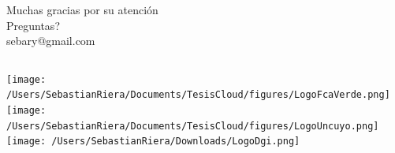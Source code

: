\documentclass{beamer}\usepackage[]{graphicx}\usepackage[]{color}
\begin{document}
\begin{frame}
  \centering
   Muchas gracias por su atención \\
       \vspace{0.5cm}        \centering
       Preguntas? \\
      sebary@gmail.com
\end{frame}

{
\begin{frame} \vspace*{.5cm}\titlepage  
  \begin{columns}
    \texttt{[image: /Users/SebastianRiera/Documents/TesisCloud/figures/LogoFcaVerde.png]}
    \texttt{[image: /Users/SebastianRiera/Documents/TesisCloud/figures/LogoUncuyo.png]}
    \texttt{[image: /Users/SebastianRiera/Downloads/LogoDgi.png]}
  \end{columns}
\end{frame}
}

\appendix




  
\end{document}
